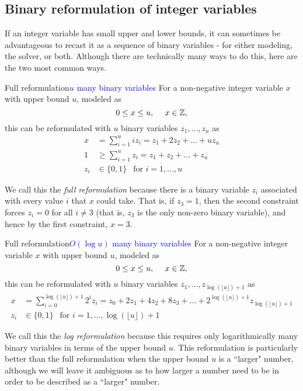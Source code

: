 \documentclass[../open-optimization/open-optimization.tex]{subfiles}
\begin{document}
\subsection{Binary reformulation of integer variables}
If an integer variable has small upper and lower bounds, it can sometimes be advantageous to recast it as a sequence of binary variables - for either modeling, the solver, or both.   Although there are technically many ways to do this, here are the two most common ways.

\begin{general}{Full reformulation}{\textcolor{blue}{$u$ many binary variables}}
\label{general:full-reformulation}
For a non-negative integer variable $x$ with upper bound $u$, modeled as 
\begin{equation}
0 \leq x \leq u, \ \ \ \ x \in {\mathbb{Z}},
\end{equation}
this can be reformulated with $u$ binary variables $z_1, \dots, z_u$ as 
\begin{equation}
\begin{split}
x & = \sum_{i=1}^u i z_i = z_1 + 2 z_2 + \dots + u z_u\\
1 & \geq \sum_{i=1}^u z_i = z_1 + z_2 + \dots + z_u\\
z_i & \in \{0,1\} \ \ \text{ for } i=1, \dots, u
\end{split}
\end{equation}
\end{general}
We call this the \emph{full reformulation} because there is a binary variable $z_i$ associated with every value $i$ that $x$ could take.  That is, if $z_3 = 1$, then the second constraint forces $z_i = 0$ for all $i \neq 3$ (that is, $z_3$ is the only non-zero binary variable), and hence by the first constraint, $x = 3$.

\begin{general}{Full reformulation}{\textcolor{blue}{$O(\log u)$ many binary variables}}
\label{general:log-reformulation}
For a non-negative integer variable $x$ with upper bound $u$, modeled as 
\begin{equation}
0 \leq x \leq u, \ \ \ \ x \in {\mathbb{Z}},
\end{equation}
this can be reformulated with $u$ binary variables $z_1, \dots, z_{\log(\lfloor u \rfloor)+ 1}$ as 
\begin{equation}
\begin{split}
x & = \sum_{i=0}^{\log(\lfloor u \rfloor)+ 1}2^i z_i = z_0 + 2 z_1 +  4 z_2 + 8 z_3 + \dots + 2^{\log(\lfloor u \rfloor) + 1} z_{\log(\lfloor u \rfloor)+ 1}\\
z_i & \in \{0,1\} \ \ \text{ for } i=1, \dots, \log(\lfloor u \rfloor)+ 1
\end{split}
\end{equation}
\end{general}
We call this the \emph{log reformulation} because this requires only logarithmically many binary variables in terms of the upper bound $u$.   This reformulation is particularly better than the full reformulation when the upper bound $u$ is a ``larger" number, although we will leave it ambiguous as to how larger a number need to be in order to be described as a ``larger" number. 
\end{document}
